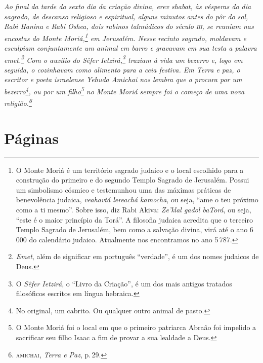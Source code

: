 \pagebreak

{
\thispagestyle{empty}

\mbox{}

\vspace{5cm}

\footnotesize
\noindent{}\emph{\noindent{}Ao final da tarde do sexto dia da criação divina, \emph{erev shabat}, às vésperas do dia sagrado, de descanso religioso e espiritual, alguns minutos antes do pôr do sol, Rabi Hanina e Rabi Oshea, dois rabinos talmúdicos do século \textsc{iii}, se reuniam nas encostas do Monte Moriá,\footnote{O Monte Moriá é um território sagrado judaico e o local escolhido para a construção do primeiro e do segundo Templo Sagrado de Jerusalém. Possui um simbolismo cósmico e testemunhou uma das máximas práticas de benevolência judaica, \emph{veahavtá lereachá kamocha}, ou seja, ``ame o teu próximo como a ti mesmo''. Sobre isso, diz Rabi Akiva: \emph{Ze'klal gadol baTorá}, ou seja, ``este é o maior princípio da Torá''. A filosofia judaica acredita que o terceiro Templo Sagrado de Jerusalém, bem como a salvação divina, virá até o ano 6\,000 do calendário judaico. Atualmente nos encontramos no ano 5\,787.} em Jerusalém. Nesse recinto sagrado, moldavam e esculpiam conjuntamente um animal em barro e gravavam em sua testa a palavra \emph{emet}.\footnote{\emph{Emet}, além de significar em português ``verdade'', é um dos nomes judaicos de Deus.} Com o auxílio do \emph{Sêfer Ietzirá},\footnote{O \emph{Sêfer Ietzirá}, o ``Livro da Criação'', é um dos mais antigos tratados filosóficos escritos em língua hebraica.} traziam à vida um bezerro e, logo em seguida, o cozinhavam como alimento para a ceia festiva. Em \emph{Terra e paz}, o escritor e poeta israelense Yehuda Amichai nos lembra que a procura por um bezerro\footnote{No original, um cabrito. Ou qualquer outro animal de pasto.}, ou por um filho\footnote{O Monte Moriá foi o local em que o primeiro patriarca Abraão foi impelido a sacrificar seu filho Isaac a fim de provar a sua lealdade a Deus.} no Monte Moriá sempre foi o começo de uma nova religião.\footnote{\textsc{amichai}, \emph{Terra e Paz}, p.\,29.}}

\pagebreak
}

\chapter{Páginas}


